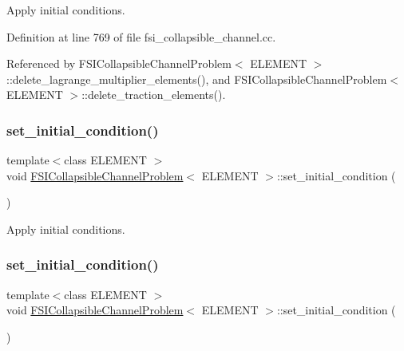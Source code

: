 Apply initial conditions. 



Definition at line 769 of file fsi\+\_\+collapsible\+\_\+channel.\+cc.



Referenced by F\+S\+I\+Collapsible\+Channel\+Problem$<$ E\+L\+E\+M\+E\+N\+T $>$\+::delete\+\_\+lagrange\+\_\+multiplier\+\_\+elements(), and F\+S\+I\+Collapsible\+Channel\+Problem$<$ E\+L\+E\+M\+E\+N\+T $>$\+::delete\+\_\+traction\+\_\+elements().

\mbox{\label{classFSICollapsibleChannelProblem_afdd6752cb134fd09ee8830158ed557b2}} 
\subsubsection{\texorpdfstring{set\+\_\+initial\+\_\+condition()}{set\_initial\_condition()}\hspace{0.1cm}{\footnotesize\ttfamily [2/4]}}
{\footnotesize\ttfamily template$<$class E\+L\+E\+M\+E\+NT $>$ \\
void \hyperlink{classFSICollapsibleChannelProblem}{F\+S\+I\+Collapsible\+Channel\+Problem}$<$ E\+L\+E\+M\+E\+NT $>$\+::set\+\_\+initial\+\_\+condition (\begin{DoxyParamCaption}{ }\end{DoxyParamCaption})}



Apply initial conditions. 

\mbox{\label{classFSICollapsibleChannelProblem_afdd6752cb134fd09ee8830158ed557b2}} 
\subsubsection{\texorpdfstring{set\+\_\+initial\+\_\+condition()}{set\_initial\_condition()}\hspace{0.1cm}{\footnotesize\ttfamily [3/4]}}
{\footnotesize\ttfamily template$<$class E\+L\+E\+M\+E\+NT $>$ \\
void \hyperlink{classFSICollapsibleChannelProblem}{F\+S\+I\+Collapsible\+Channel\+Problem}$<$ E\+L\+E\+M\+E\+NT $>$\+::set\+\_\+initial\+\_\+condition (\begin{DoxyParamCaption}{ }\end{DoxyParamCaption})}



